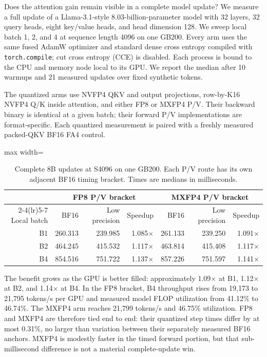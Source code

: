 Does the attention gain remain visible in a complete model update?  We measure
a full update of a Llama-3.1-style 8.03-billion-parameter
model with 32 layers, 32 query heads, eight key/value heads, and head dimension
128.  We sweep local batch 1, 2, and 4 at sequence length 4096 on one GB200.
Every arm uses the same fused AdamW optimizer and standard dense cross entropy
compiled with \texttt{torch.compile}; cut cross entropy (CCE) is disabled.
Each process is bound to the CPU and memory node local to its GPU.  We report
the median after 10 warmups and 21 measured updates over fixed synthetic
tokens.

The quantized arms use NVFP4 QKV and output projections, row-by-K16 NVFP4
Q/K inside attention, and either FP8 or MXFP4 P/V.  Their backward binary is
identical at a given batch; their forward P/V implementations are
format-specific.  Each quantized measurement is paired with a freshly
measured packed-QKV BF16 FA4 control.

\begin{table}[htbp]
\centering
\caption{Complete 8B updates at S4096 on one GB200.  Each P/V route has its own
adjacent BF16 timing bracket.  Times are medians in milliseconds.}
\label{tab:llama8b-e2e}
\small
\begin{adjustbox}{max width=\textwidth}
\begin{tabular}{rrrrrrr}
\toprule
& \multicolumn{3}{c}{FP8 P/V bracket} & \multicolumn{3}{c}{MXFP4 P/V bracket} \\
\cmidrule(lr){2-4}\cmidrule(lr){5-7}
Local batch & BF16 & Low precision & Speedup & BF16 & Low precision & Speedup \\
\midrule
B1 & 260.313 & 239.985 & 1.085$\times$ & 261.133 & 239.250 & 1.091$\times$ \\
B2 & 464.245 & 415.532 & 1.117$\times$ & 463.814 & 415.408 & 1.117$\times$ \\
B4 & 854.516 & 751.722 & 1.137$\times$ & 857.226 & 751.597 & 1.141$\times$ \\
\bottomrule
\end{tabular}
\end{adjustbox}
\end{table}
\FloatBarrier

The benefit grows as the GPU is better filled: approximately 1.09$\times$ at
B1, 1.12$\times$ at B2, and 1.14$\times$ at B4.  In the FP8 bracket, B4
throughput rises from 19,173 to 21,795 tokens/s per GPU and measured model FLOP
utilization from 41.12\% to 46.74\%.  The MXFP4 arm reaches 21,799 tokens/s and
46.75\% utilization.  FP8 and MXFP4 are therefore tied end to end: their
quantized step times differ by at most 0.31\%, no larger than variation
between their separately measured BF16 anchors.  MXFP4 is modestly faster
in the timed forward portion, but that sub-millisecond difference is not a
material complete-update win.

